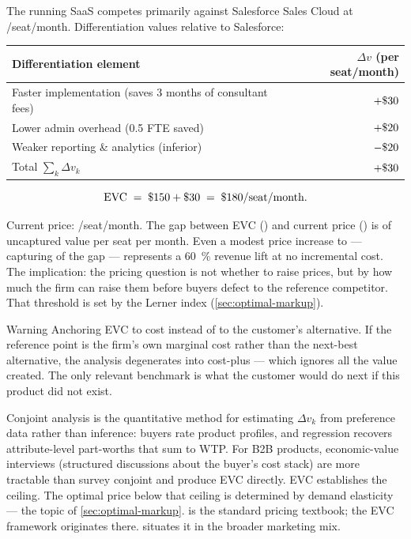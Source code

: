 \begin{example}
The running SaaS competes primarily against Salesforce Sales Cloud at /seat/month. Differentiation values relative to Salesforce:

\medskip
\begin{tabular}{lr}
  \toprule
  Differentiation element & \(\Delta v\) (per seat/month) \\
  \midrule
  Faster implementation (saves 3 months of consultant fees) & $+\$\num{30}$ \\
  Lower admin overhead (0.5 FTE saved)                     & $+\$\num{20}$ \\
  Weaker reporting \& analytics (inferior)                  & $-\$\num{20}$ \\
  \midrule
  Total \(\sum_k \Delta v_k\)                               & $+\$\num{30}$ \\
  \bottomrule
\end{tabular}

\medskip
\[
  \mathrm{EVC} \;=\; \$\num{150} + \$\num{30} \;=\; \$\num{180}/\text{seat/month}.
\]

Current price: /seat/month. The gap between EVC () and current price () is  of uncaptured value per seat per month. Even a modest price increase to  --- capturing  of the  gap --- represents a \qty{60}{\percent} revenue lift at no incremental cost. The implication: the pricing question is not whether to raise prices, but by how much the firm can raise them before buyers defect to the reference competitor. That threshold is set by the Lerner index (\cref{sec:optimal-markup}).
\end{example}

\begin{admonition}{Warning}
Anchoring EVC to cost instead of to the customer's alternative. If the reference point is the firm's own marginal cost rather than the next-best alternative, the analysis degenerates into cost-plus --- which ignores all the value created. The only relevant benchmark is what the customer would do next if this product did not exist.
\end{admonition}

Conjoint analysis is the quantitative method for estimating \(\Delta v_k\) from preference data rather than inference: buyers rate product profiles, and regression recovers attribute-level part-worths that sum to WTP. For B2B products, economic-value interviews (structured discussions about the buyer's cost stack) are more tractable than survey conjoint and produce EVC directly. EVC establishes the ceiling. The optimal price below that ceiling is determined by demand elasticity --- the topic of \cref{sec:optimal-markup}. \textcite{nagle2023strategy} is the standard pricing textbook; the EVC framework originates there. \textcite{kotler2021} situates it in the broader marketing mix.

